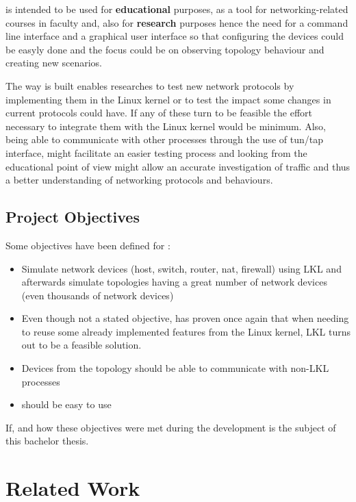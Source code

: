 \project is intended to be used for \textbf{educational} purposes, as a tool for networking-related courses in faculty and, also for \textbf{research} purposes hence the need for a command line interface and a graphical user interface so that configuring the devices could be easyly done and the focus could be on observing topology behaviour and creating new scenarios.

The way \project is built enables researches to test new network protocols by implementing them in the Linux kernel or to test the impact some changes in current protocols could have. If any of these turn to be feasible the effort necessary to integrate them with the Linux kernel would be minimum. Also, being able to communicate with other processes through the use of tun/tap interface, might facilitate an easier testing process and looking from the educational point of view might allow an accurate investigation of traffic and thus a better understanding of networking protocols and behaviours.  

\subsection{Project Objectives}
\label{sub-sec:proj-objectives}
Some objectives have been defined for \project:
\begin{itemize}
\item Simulate network devices (host, switch, router, nat, firewall) using LKL and afterwards simulate topologies having a great number of network devices (even thousands of network devices)
\item Even though not a stated objective, \project has proven once again that when needing to reuse some already implemented features from the Linux kernel, LKL turns out to be a feasible solution.
\item Devices from the topology should be able to communicate with non-LKL processes
\item \project should be easy to use
\end{itemize}

If, and how these objectives were met during the \project development is the subject of this bachelor thesis.
\section{Related Work}
\label{sec:proj-related}

